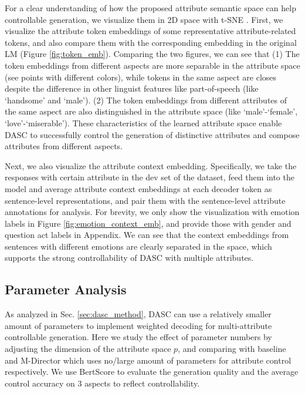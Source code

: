 For a clear understanding of how the proposed attribute semantic space can help controllable generation, we visualize them in 2D space with t-SNE \citep{van2008visualizing}. First, we visualize the attribute token embeddings of some representative attribute-related tokens, and also compare them with the corresponding embedding in the original LM (Figure \ref{fig:token_emb}). Comparing the two figures, we can see that (1) The token embeddings from different aspects are more separable in the attribute space (see points with different colors), while tokens in the same aspect are closes despite the difference in other linguist features like part-of-speech (like `handsome' and `male'). (2) The token embeddings from different attributes of the same aspect are also distinguished in the attribute space (like `male'-`female', `love'-`miserable'). These characteristics of the learned attribute space enable DASC to successfully control the generation of distinctive attributes and compose attributes from different aspects.


Next, we also visualize the attribute context embedding. Specifically, we take the responses with certain attribute in the dev set of the dataset, feed them into the model and average attribute context embeddings at each decoder token as sentence-level representations, and pair them with the sentence-level attribute annotations for analysis. For brevity, we only show the visualization with emotion labels in Figure \ref{fig:emotion_context_emb}, and provide those with gender and question act labels in Appendix. We can see that the context embeddings from sentences with different emotions are clearly separated in the space, which supports the strong controllability of DASC with multiple attributes.

\subsection{Parameter Analysis}
\label{sec:parameter_analysis}
As analyzed in Sec. \ref{sec:dasc_method}, DASC can use a relatively smaller amount of parameters to implement weighted decoding for multi-attribute controllable generation. Here we study the effect of parameter numbers by adjusting the dimension of the attribute space $p$, and comparing with baseline and M-Director which uses no/large amount of parameters for attribute control respectively. We use BertScore to evaluate the generation quality and the average control accuracy on 3 aspects to reflect controllability.

